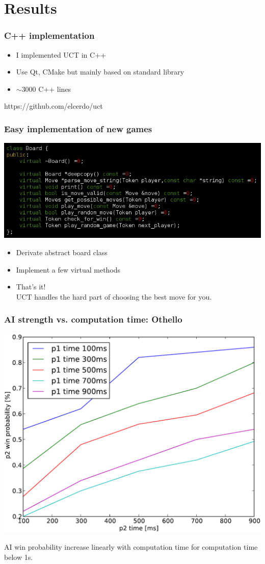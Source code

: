 \documentclass{beamer}
\begin{document}
\section{Results}

\begin{frame}
\frametitle{C++ implementation}

\begin{itemize}
\item I implemented UCT in C++
\item Use Qt, CMake but mainly based on standard library
\item $\sim3000$ C++ lines
\end{itemize}
\begin{center}
\Huge \alert{https://github.com/elcerdo/uct}
\end{center}
\end{frame}

\begin{frame}
\frametitle{Easy implementation of new games}
\begin{center}
\includegraphics[width=\linewidth]{board_virtual}
\end{center}
\begin{itemize}
\item Derivate abstract board class
\item Implement a few virtual methods
\item That's it! \\ UCT handles the hard part of choosing the best move for you.
\end{itemize}
\end{frame}

\begin{frame}
\frametitle{AI strength vs. computation time: Othello}
\begin{center}
\includegraphics[width=.6\linewidth]{perf_othello}
\end{center}
AI win probability increase linearly with computation time for computation time below 1s.
\end{frame}
\end{document}
